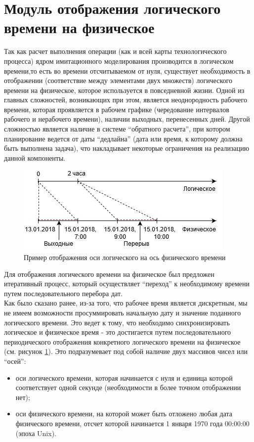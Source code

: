 \section{Модуль отображения логического времени на физическое}
\indent Так как расчет выполнения операции (как и всей карты технологического процесса) ядром имитационного моделирования производится в логическом времени,то есть во времени отсчитываемом от нуля, существует необходимость в отображении (соответствие между элементами двух множеств) логического времени на физическое, которое используется в повседневной жизни.
Одной из главных сложностей, возникающих при этом, является неоднородность рабочего времени, которая проявляется в рабочем графике (чередование интервалов рабочего и нерабочего времени), наличии выходных, перенесенных дней.
Другой сложностью является наличие в системе ``обратного расчета'', при котором планирование ведется от даты ``дедлайна'' (дата или время, к которому должна быть выполнена задача), что накладывает некоторые ограничения на реализацию данной компоненты.
\begin{figure}[h!]
	\centering
	\includegraphics[width=0.7\linewidth]{pics/scheduleAxes.png}
	\caption{Пример отображения оси логического на ось физического времени}
	\label{fig:axes}
\end{figure}

\indent Для отображения логического времени на физическое был предложен итеративный процесс, который осуществляет ``переход'' к необходимому времени путем последовательного перебора дат.\\
\indent Как было сказано ранее, из-за того, что рабочее время является дискретным, мы не имеем возможности просуммировать начальную дату и значение поданного логического времени.
Это ведет к тому, что необходимо синхронизировать логическое и физическое время - это достигается путем последовательного периодического отображения конкретного логического времени на физическое (см. рисунок \ref{fig:axes}).
Это подразумевает под собой наличие двух массивов чисел или ``осей'':

\begin{itemize}
	\item оси логического времени, которая начинается с нуля и единица которой соответствует одной секунде (необходимости в более точном отображении нет);
	\item оси физического времени, на которой может быть отложено любая дата физического времени, отсчет которой начинается 1 января 1970 года 00:00:00 (эпоха Unix).
\end{itemize}

